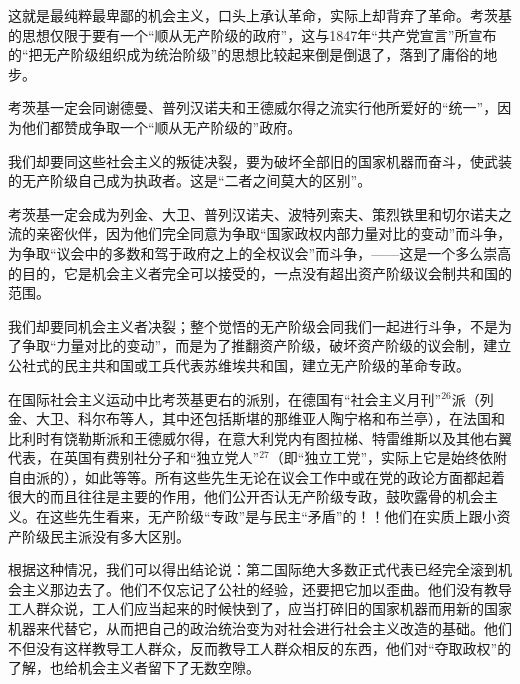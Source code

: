 \pskip 
\leftskip=0mm
\normalsize

这就是最纯粹最卑鄙的机会主义，口头上承认革命，实际上却背弃了革命。考茨基的思想仅限于要有一个“顺从无产阶级的政府”，这与1847年“共产党宣言”所宣布的“把无产阶级组织成为统治阶级”的思想比较起来倒是倒退了，落到了庸俗的地步。

考茨基一定会同谢德曼、普列汉诺夫和王德威尔得之流实行他所爱好的“统一”，因为他们都赞成争取一个“顺从无产阶级的”政府。

我们却要同这些社会主义的叛徒决裂，要为破坏全部旧的国家机器而奋斗，使武装的无产阶级自己{\kaishu 成为执政者}。这是“二者之间莫大的区别”。

考茨基一定会成为列金、大卫、普列汉诺夫、波特列索夫、策烈铁里和切尔诺夫之流的亲密伙伴，因为他们完全同意为争取“国家政权内部力量对比的变动”而斗争，为争取“议会中的多数和驾于政府之上的全权议会”而斗争，——这是一个多么崇高的目的，它是机会主义者完全可以接受的，一点没有超出资产阶级议会制共和国的范围。

我们却要同机会主义者决裂；整个觉悟的无产阶级会同我们一起进行斗争，不是为了争取“力量对比的变动”，而是为了{\kaishu 推翻资产阶级，破坏}资产阶级的议会制，建立公社式的民主共和国或工兵代表苏维埃共和国，建立无产阶级的革命专政。

\mbox{}

\mbox{}

在国际社会主义运动中比考茨基更右的派别，在德国有“社会主义月刊”$^{26}$派（列金、大卫、科尔布等人，其中还包括斯堪的那维亚人陶宁格和布兰亭），在法国和比利时有饶勒斯派和王德威尔得，在意大利党内有图拉梯、特雷维斯以及其他右翼代表，在英国有费别社分子和“独立党人”$^{27}$（即“独立工党”，实际上它是始终依附自由派的），如此等等。所有这些先生无论在议会工作中或在党的政论方面都起着很大的而且往往是主要的作用，他们公开否认无产阶级专政，鼓吹露骨的机会主义。在这些先生看来，无产阶级“专政”是与民主“矛盾”的！！他们在实质上跟小资产阶级民主派没有多大区别。

根据这种情况，我们可以得出结论说：第二国际绝大多数正式代表已经完全滚到机会主义那边去了。他们不仅忘记了公社的经验，还要把它加以歪曲。他们没有教导工人群众说，工人们应当起来的时候快到了，应当打碎旧的国家机器而用新的国家机器来代替它，从而把自己的政治统治变为对社会进行社会主义改造的基础。他们不但没有这样教导工人群众，反而教导工人群众相反的东西，他们对“夺取政权”的了解，也给机会主义者留下了无数空隙。


